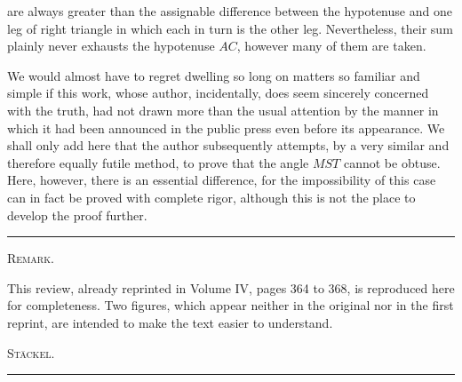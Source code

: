 are always greater than the assignable difference between the hypotenuse and one
leg of  right triangle in which each in turn is the
other leg. Nevertheless, their sum plainly never exhausts the
hypotenuse $AC$, however many of them are taken.

We would almost have to regret dwelling so long on matters so familiar and simple
if this work, whose author, incidentally, does seem sincerely concerned with
the truth, had not drawn more than the usual attention by the manner in which it
had been announced in the public press even before its
appearance. We shall only add here that
the author subsequently attempts, by a very similar and therefore equally futile method, to prove
that the angle $MST$ cannot be obtuse. Here, however, there is an
essential difference, for the impossibility of this case can in fact be proved with
complete rigor, although this is not the place to develop the proof
further.

\begin{center}\rule{3cm}{0.4pt}\end{center}

\begin{center}
\textsc{Remark.}
\end{center}

This review, already reprinted in Volume IV, pages 364 to 368, is reproduced here
for completeness. Two figures, which appear neither in the
original nor in the first reprint, are intended to make the text
easier to understand.

\begin{flushright}\textsc{Stäckel.}\end{flushright}

\begin{center}\rule{3cm}{0.4pt}\end{center}
